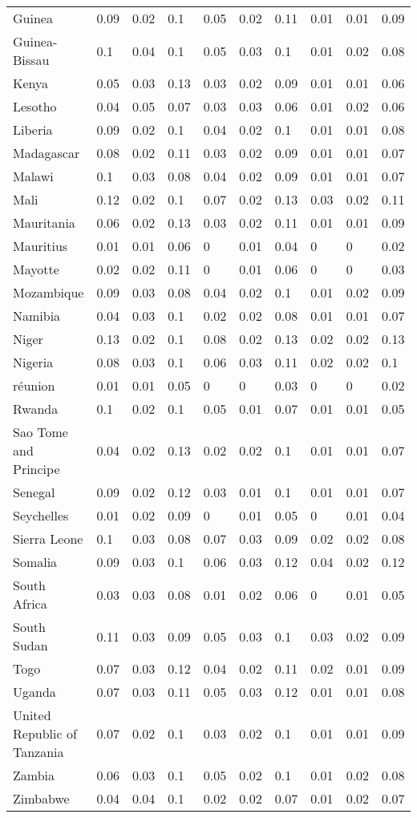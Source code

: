 \begin{longtable}[t]{llllllllll}
Guinea & 0.09 & 0.02 & 0.1 & 0.05 & 0.02 & 0.11 & 0.01 & 0.01 & 0.09\\
Guinea-Bissau & 0.1 & 0.04 & 0.1 & 0.05 & 0.03 & 0.1 & 0.01 & 0.02 & 0.08\\
Kenya & 0.05 & 0.03 & 0.13 & 0.03 & 0.02 & 0.09 & 0.01 & 0.01 & 0.06\\
Lesotho & 0.04 & 0.05 & 0.07 & 0.03 & 0.03 & 0.06 & 0.01 & 0.02 & 0.06\\
Liberia & 0.09 & 0.02 & 0.1 & 0.04 & 0.02 & 0.1 & 0.01 & 0.01 & 0.08\\
Madagascar & 0.08 & 0.02 & 0.11 & 0.03 & 0.02 & 0.09 & 0.01 & 0.01 & 0.07\\
Malawi & 0.1 & 0.03 & 0.08 & 0.04 & 0.02 & 0.09 & 0.01 & 0.01 & 0.07\\
Mali & 0.12 & 0.02 & 0.1 & 0.07 & 0.02 & 0.13 & 0.03 & 0.02 & 0.11\\
Mauritania & 0.06 & 0.02 & 0.13 & 0.03 & 0.02 & 0.11 & 0.01 & 0.01 & 0.09\\
Mauritius & 0.01 & 0.01 & 0.06 & 0 & 0.01 & 0.04 & 0 & 0 & 0.02\\
Mayotte & 0.02 & 0.02 & 0.11 & 0 & 0.01 & 0.06 & 0 & 0 & 0.03\\
Mozambique & 0.09 & 0.03 & 0.08 & 0.04 & 0.02 & 0.1 & 0.01 & 0.02 & 0.09\\
Namibia & 0.04 & 0.03 & 0.1 & 0.02 & 0.02 & 0.08 & 0.01 & 0.01 & 0.07\\
Niger & 0.13 & 0.02 & 0.1 & 0.08 & 0.02 & 0.13 & 0.02 & 0.02 & 0.13\\
Nigeria & 0.08 & 0.03 & 0.1 & 0.06 & 0.03 & 0.11 & 0.02 & 0.02 & 0.1\\
réunion & 0.01 & 0.01 & 0.05 & 0 & 0 & 0.03 & 0 & 0 & 0.02\\
Rwanda & 0.1 & 0.02 & 0.1 & 0.05 & 0.01 & 0.07 & 0.01 & 0.01 & 0.05\\
Sao Tome and Principe & 0.04 & 0.02 & 0.13 & 0.02 & 0.02 & 0.1 & 0.01 & 0.01 & 0.07\\
Senegal & 0.09 & 0.02 & 0.12 & 0.03 & 0.01 & 0.1 & 0.01 & 0.01 & 0.07\\
Seychelles & 0.01 & 0.02 & 0.09 & 0 & 0.01 & 0.05 & 0 & 0.01 & 0.04\\
Sierra Leone & 0.1 & 0.03 & 0.08 & 0.07 & 0.03 & 0.09 & 0.02 & 0.02 & 0.08\\
Somalia & 0.09 & 0.03 & 0.1 & 0.06 & 0.03 & 0.12 & 0.04 & 0.02 & 0.12\\
South Africa & 0.03 & 0.03 & 0.08 & 0.01 & 0.02 & 0.06 & 0 & 0.01 & 0.05\\
South Sudan & 0.11 & 0.03 & 0.09 & 0.05 & 0.03 & 0.1 & 0.03 & 0.02 & 0.09\\
Togo & 0.07 & 0.03 & 0.12 & 0.04 & 0.02 & 0.11 & 0.02 & 0.01 & 0.09\\
Uganda & 0.07 & 0.03 & 0.11 & 0.05 & 0.03 & 0.12 & 0.01 & 0.01 & 0.08\\
United Republic of Tanzania & 0.07 & 0.02 & 0.1 & 0.03 & 0.02 & 0.1 & 0.01 & 0.01 & 0.09\\
Zambia & 0.06 & 0.03 & 0.1 & 0.05 & 0.02 & 0.1 & 0.01 & 0.02 & 0.08\\
Zimbabwe & 0.04 & 0.04 & 0.1 & 0.02 & 0.02 & 0.07 & 0.01 & 0.02 & 0.07\\*
\end{longtable}
\endgroup{}
